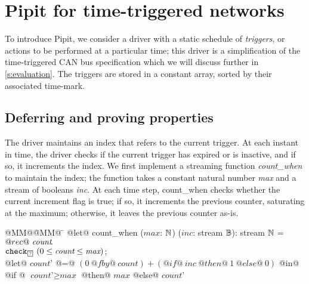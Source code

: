 
\section{Pipit for time-triggered networks}
\label{s:motivation}


To introduce Pipit, we consider a driver with a static schedule of \emph{triggers}, or actions to be performed at a particular time; this driver is a simplification of the time-triggered CAN bus specification \cite{fuehrer2001time} which we will discuss further in \autoref{s:evaluation}.
The triggers are stored in a constant array, sorted by their associated time-mark.

\subsection{Deferring and proving properties}

The driver maintains an index that refers to the current trigger.
At each instant in time, the driver checks if the current trigger has expired or is inactive, and if so, it increments the index.
We first implement a streaming function \emph{count_when} to maintain the index; the function takes a constant natural number \emph{max} and a stream of booleans \emph{inc}.
At each time step, count_when checks whether the current increment flag is true; if so, it increments the previous counter, saturating at the maximum; otherwise, it leaves the previous counter as-is.

\begin{tabbing}
  @MM@\= @MM@ \= \kill
  @let@ count_when ($\textit{max}$: $\mathbb{N}$) ($\textit{inc}$: stream $\mathbb{B}$): stream $\mathbb{N}$ = \\
    \> $@rec@~\textit{count}\hspace{-0.1em}.~$ \\
    \> \> $\xcheckP{\PSUnknown}{(0 \le \textit{count} \le \textit{max})}$; \\
    \> \> @let@ $\textit{count'}$ @=@ $(0~@fby@~\textit{count}) + (@if@~\textit{inc}~@then@~1~@else@~0)$ @in@ \\
    \> \> @if @ $\textit{count'} \ge \textit{max}$ @then@ $\textit{max}$  @else@ $\textit{count'}$
\end{tabbing}

